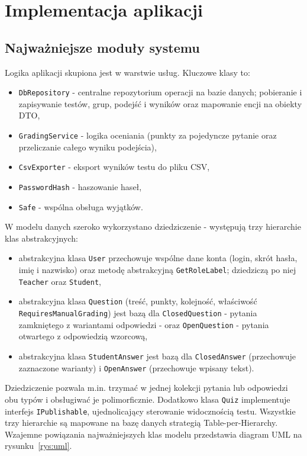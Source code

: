 ﻿\chapter{Implementacja aplikacji}
\label{cha:implementacja}

\section{Najważniejsze moduły systemu}
\label{sec:moduly}

Logika aplikacji skupiona jest w warstwie usług. Kluczowe klasy to:

\begin{itemize}
  \item \texttt{DbRepository} - centralne repozytorium operacji na bazie danych; pobieranie
        i zapisywanie testów, grup, podejść i wyników oraz mapowanie encji na obiekty DTO,
  \item \texttt{GradingService} - logika oceniania (punkty za pojedyncze pytanie oraz przeliczanie
        całego wyniku podejścia),
  \item \texttt{CsvExporter} - eksport wyników testu do pliku CSV,
  \item \texttt{PasswordHash} - haszowanie haseł,
  \item \texttt{Safe} - wspólna obsługa wyjątków.
\end{itemize}

W modelu danych szeroko wykorzystano dziedziczenie - występują trzy hierarchie klas abstrakcyjnych:

\begin{itemize}
  \item abstrakcyjna klasa \texttt{User} przechowuje wspólne dane konta (login, skrót hasła, imię
        i nazwisko) oraz metodę abstrakcyjną \texttt{GetRoleLabel}; dziedziczą po niej \texttt{Teacher}
        oraz \texttt{Student},
  \item abstrakcyjna klasa \texttt{Question} (treść, punkty, kolejność, właściwość
        \texttt{RequiresManualGrading}) jest bazą dla \texttt{ClosedQuestion} - pytania zamkniętego
        z wariantami odpowiedzi - oraz \texttt{OpenQuestion} - pytania otwartego z odpowiedzią
        wzorcową,
  \item abstrakcyjna klasa \texttt{StudentAnswer} jest bazą dla \texttt{ClosedAnswer} (przechowuje
        zaznaczone warianty) i \texttt{OpenAnswer} (przechowuje wpisany tekst).
\end{itemize}

Dziedziczenie pozwala m.in. trzymać w jednej kolekcji pytania lub odpowiedzi obu typów i obsługiwać
je polimorficznie. Dodatkowo klasa \texttt{Quiz} implementuje interfejs \texttt{IPublishable},
ujednolicający sterowanie widocznością testu. Wszystkie trzy hierarchie są mapowane na bazę danych
strategią Table-per-Hierarchy. Wzajemne powiązania najważniejszych klas modelu przedstawia diagram
UML na rysunku~\ref{rys:uml}.

